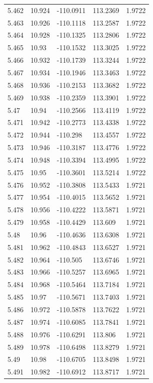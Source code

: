 \begin{tabular}{lllll}
5.462 & 10.924 & -110.0911 & 113.2369 & 1.9722 \\
5.463 & 10.926 & -110.1118 & 113.2587 & 1.9722 \\
5.464 & 10.928 & -110.1325 & 113.2806 & 1.9722 \\
5.465 & 10.93 & -110.1532 & 113.3025 & 1.9722 \\
5.466 & 10.932 & -110.1739 & 113.3244 & 1.9722 \\
5.467 & 10.934 & -110.1946 & 113.3463 & 1.9722 \\
5.468 & 10.936 & -110.2153 & 113.3682 & 1.9722 \\
5.469 & 10.938 & -110.2359 & 113.3901 & 1.9722 \\
5.47 & 10.94 & -110.2566 & 113.4119 & 1.9722 \\
5.471 & 10.942 & -110.2773 & 113.4338 & 1.9722 \\
5.472 & 10.944 & -110.298 & 113.4557 & 1.9722 \\
5.473 & 10.946 & -110.3187 & 113.4776 & 1.9722 \\
5.474 & 10.948 & -110.3394 & 113.4995 & 1.9722 \\
5.475 & 10.95 & -110.3601 & 113.5214 & 1.9722 \\
5.476 & 10.952 & -110.3808 & 113.5433 & 1.9721 \\
5.477 & 10.954 & -110.4015 & 113.5652 & 1.9721 \\
5.478 & 10.956 & -110.4222 & 113.5871 & 1.9721 \\
5.479 & 10.958 & -110.4429 & 113.609 & 1.9721 \\
5.48 & 10.96 & -110.4636 & 113.6308 & 1.9721 \\
5.481 & 10.962 & -110.4843 & 113.6527 & 1.9721 \\
5.482 & 10.964 & -110.505 & 113.6746 & 1.9721 \\
5.483 & 10.966 & -110.5257 & 113.6965 & 1.9721 \\
5.484 & 10.968 & -110.5464 & 113.7184 & 1.9721 \\
5.485 & 10.97 & -110.5671 & 113.7403 & 1.9721 \\
5.486 & 10.972 & -110.5878 & 113.7622 & 1.9721 \\
5.487 & 10.974 & -110.6085 & 113.7841 & 1.9721 \\
5.488 & 10.976 & -110.6291 & 113.806 & 1.9721 \\
5.489 & 10.978 & -110.6498 & 113.8279 & 1.9721 \\
5.49 & 10.98 & -110.6705 & 113.8498 & 1.9721 \\
5.491 & 10.982 & -110.6912 & 113.8717 & 1.9721 \\

\end{tabular}

